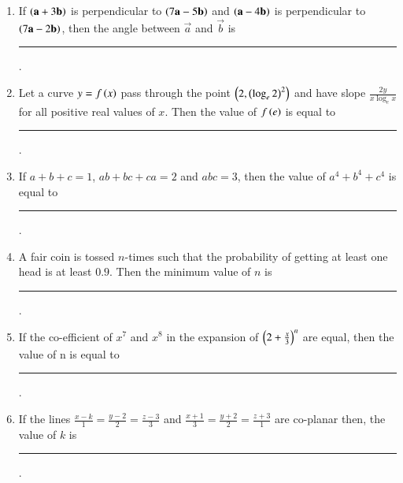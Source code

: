 \documentclass[journal,12pt,onecolumn]{IEEEtran}
\theoremstyle{remark}
\begin{document}
\begin{enumerate}
\item If $\left(\mathbf{a}+3\mathbf{b}\right)$ is perpendicular to $\left(7\mathbf{a}-5\mathbf{b}\right)$ and $\left(\mathbf{a}-4\mathbf{b}\right)$ is perpendicular to $\left(7\mathbf{a}-2\mathbf{b}\right)$, then the angle between $\vec{a}$ and $\vec{b}$  is \rule{1cm}{0.15mm}.

\hfill{}

\item Let a curve $y=f\left(x\right)$ pass through the point $\left(2,\left(\log_e{2}\right)^2\right)$ and have slope $\frac{2y}{x\log_e{x}}$ for all positive real values of $x$. Then the value of $f\left(e\right)$ is equal to \rule{1cm}{0.15mm}.

\hfill{}

\item If $a+b+c=1$, $ab+bc+ca=2$ and $abc=3$, then the value of $a^4+b^4+c^4$ is equal to \rule{1cm}{0.15mm}.

\hfill{}

\item A fair coin is tossed $n$-times such that the probability of getting at least one head is at least $0.9$. Then the minimum value of $n$ is \rule{1cm}{0.15mm}. 

\hfill{}

\item If the co-efficient of $x^7$ and $x^8$ in the expansion of $\left(2+\frac{x}{3}\right)^n$ are equal, then the value of n is equal to \rule{1cm}{0.15mm}.

\hfill{}

\item If the lines $\frac{x-k}{1}=\frac{y-2}{2}=\frac{z-3}{3}$ and $\frac{x+1}{3}=\frac{y+2}{2}=\frac{z+3}{1}$ are co-planar then, the value of $k$ is \rule{1cm}{0.15mm}.

\hfill{}

\end{enumerate}
\end{document}
